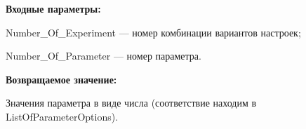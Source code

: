 \textbf{Входные параметры:}

Number\_Of\_Experiment --- номер комбинации вариантов настроек;
 
Number\_Of\_Parameter --- номер параметра.

\textbf{Возвращаемое значение:}

Значения параметра в виде числа (соответствие находим в ListOfParameterOptions).